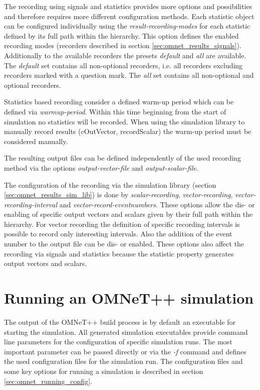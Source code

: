 The recording using signals and statistics provides more options and possibilities and therefore requires more different configuration methods.
Each statistic object can be configured individually using the \emph{result-recording-modes} for each statistic defined by its full path within the hierarchy.
This option defines the enabled recording modes (recorders described in section \ref{sec:omnet_results_signals}).
Additionally to the available recorders the presets \emph{default} and \emph{all} are available.
The \emph{default} set contains all non-optional recorders, i.e. all recorders excluding recorders marked with a question mark.
The \emph{all} set contains all non-optional and optional recorders. \cite[section 12.2.1]{omnet_manual}

Statistics based recording consider a defined warm-up period which can be defined via \emph{warmup-period}.
Within this time beginning from the start of simulation no statistics will be recorded.
When using the simulation library to manually record results (cOutVector, recordScalar) the warm-up period must be considered manually. \cite[section 12.2.2]{omnet_manual}

The resulting output files can be defined independently of the used recording method via the options \emph{output-vector-file} and \emph{output-scalar-file}. \cite[section 12.2.3]{omnet_manual}

The configuration of the recording via the simulation library (section \ref{sec:omnet_results_sim_lib}) is done by \emph{scalar-recording}, \emph{vector-recording}, \emph{vector-recording-interval} and \emph{vector-record-eventnumbers}.
These options allow the dis- or enabling of specific output vectors and scalars given by their full path within the hierarchy.
For vector recording the definition of specific recording intervals is possible to record only interesting intervals.
Also the addition of the event number to the output file can be dis- or enabled.
These options also affect the recording via signals and statistics because the statistic property generates output vectors and scalars. \cite[section 12.2.4, section 12.2.5]{omnet_manual}

\section{Running an OMNeT++ simulation}
\label{sec:omnet_running}

The output of the OMNeT++ build process is by default an executable for starting the simulation.
All generated simulation executables provide command line parameters for the configuration of specific simulation runs.
The most important parameter can be passed directly or via the \emph{-f} command and defines the used configuration files for the simulation run.
The configuration files and some key options for running a simulation is described in section \ref{sec:omnet_running_config}.

